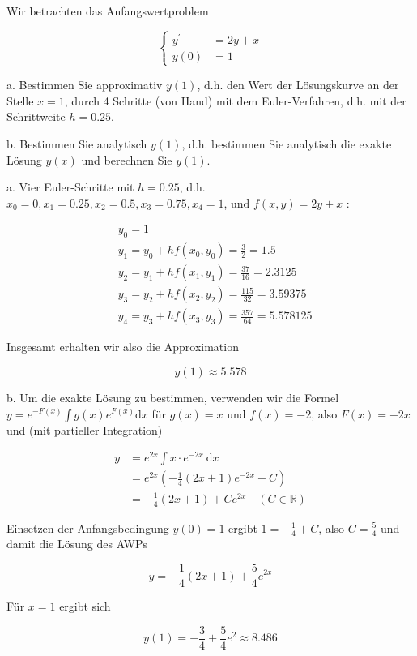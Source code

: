 \begin{example}
    Wir betrachten das Anfangswertproblem

    $$
    \left\{\begin{aligned}
    y^{\prime} & =2 y+x \\
    y(0) & =1
    \end{aligned}\right.
    $$
    
    a. Bestimmen Sie approximativ $y(1)$, d.h. den Wert der Lösungskurve an der Stelle $x=1$, durch 4 Schritte (von Hand) mit dem Euler-Verfahren, d.h. mit der Schrittweite $h=0.25$.
    
    b. Bestimmen Sie analytisch $y(1)$, d.h. bestimmen Sie analytisch die exakte Lösung $y(x)$ und berechnen Sie $y(1)$.

\tcblower
a. Vier Euler-Schritte mit $h=0.25$, d.h. $x_{0}=0, x_{1}=0.25, x_{2}=0.5, x_{3}=0.75, x_{4}=1$, und $f(x, y)=2 y+x$ :

$$
\begin{aligned}
& y_{0}=1 \\
& y_{1}=y_{0}+h f\left(x_{0}, y_{0}\right)=\frac{3}{2}=1.5 \\
& y_{2}=y_{1}+h f\left(x_{1}, y_{1}\right)=\frac{37}{16}=2.3125 \\
& y_{3}=y_{2}+h f\left(x_{2}, y_{2}\right)=\frac{115}{32}=3.59375 \\
& y_{4}=y_{3}+h f\left(x_{3}, y_{3}\right)=\frac{357}{64}=5.578125
\end{aligned}
$$

Insgesamt erhalten wir also die Approximation

$$
y(1) \approx 5.578
$$

b. Um die exakte Lösung zu bestimmen, verwenden wir die Formel $y=e^{-F(x)} \int g(x) e^{F(x)} \mathrm{d} x$ für $g(x)=x$ und $f(x)=-2$, also $F(x)=-2 x$ und (mit partieller Integration)

$$
\begin{aligned}
y & =e^{2 x} \int x \cdot e^{-2 x} \mathrm{~d} x \\
& =e^{2 x}\left(-\frac{1}{4}(2 x+1) e^{-2 x}+C\right) \\
& =-\frac{1}{4}(2 x+1)+C e^{2 x} \quad(C \in \mathbb{R})
\end{aligned}
$$

Einsetzen der Anfangsbedingung $y(0)=1$ ergibt $1=-\frac{1}{4}+C$, also $C=\frac{5}{4}$ und damit die Lösung des AWPs

$$
y=-\frac{1}{4}(2 x+1)+\frac{5}{4} e^{2 x}
$$

Für $x=1$ ergibt sich

$$
y(1)=-\frac{3}{4}+\frac{5}{4} e^{2} \approx 8.486
$$
\end{example}


